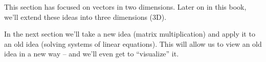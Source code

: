 \medskip


This section has focused on vectors in two dimensions. Later on in this book, we'll extend these ideas into three dimensions (3D). 
%

In the next section we'll take a new idea (matrix multiplication) and apply it to an old idea (solving systems of linear equations). This will allow us to view an old idea in a new way -- and we'll even get to ``visualize'' it.

 
 

